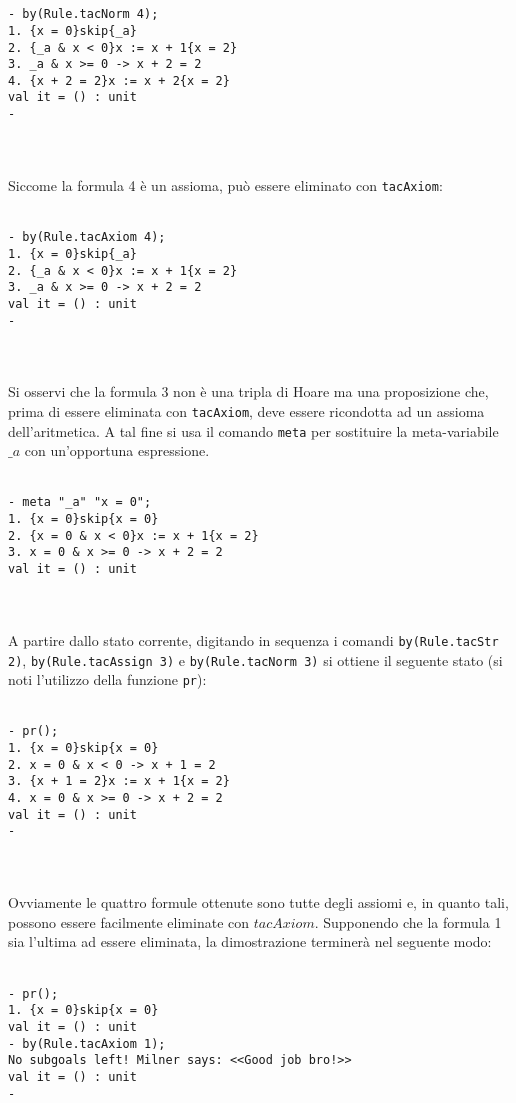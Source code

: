 \documentclass[]{article}
\begin{document}
\\
\\
\begin{BVerbatim}
- by(Rule.tacNorm 4);
1. {x = 0}skip{_a}
2. {_a & x < 0}x := x + 1{x = 2}
3. _a & x >= 0 -> x + 2 = 2
4. {x + 2 = 2}x := x + 2{x = 2}
val it = () : unit
-
\end{BVerbatim}
\\
\\
Siccome la formula 4 \`e un assioma, pu\`o essere eliminato con \texttt{tacAxiom}:
\\
\\
\begin{BVerbatim}
- by(Rule.tacAxiom 4);
1. {x = 0}skip{_a}
2. {_a & x < 0}x := x + 1{x = 2}
3. _a & x >= 0 -> x + 2 = 2
val it = () : unit
-
\end{BVerbatim}
\\
\\
Si osservi che la formula 3 non \`e una tripla di Hoare ma una proposizione che, prima di essere eliminata con \texttt{tacAxiom}, deve essere ricondotta ad un assioma dell'aritmetica. A tal fine si usa il comando \texttt{meta} per sostituire la meta-variabile $\_a$ con un'opportuna espressione.
\\
\\
\begin{BVerbatim}
- meta "_a" "x = 0";
1. {x = 0}skip{x = 0}
2. {x = 0 & x < 0}x := x + 1{x = 2}
3. x = 0 & x >= 0 -> x + 2 = 2
val it = () : unit
\end{BVerbatim}
\\
\\
A partire dallo stato corrente, digitando in sequenza i comandi \texttt{by(Rule.tacStr 2)}, \texttt{by(Rule.tacAssign 3)} e \texttt{by(Rule.tacNorm 3)} si ottiene il seguente stato (si noti l'utilizzo della funzione \texttt{pr}):
\\
\\
\begin{BVerbatim}
- pr();
1. {x = 0}skip{x = 0}
2. x = 0 & x < 0 -> x + 1 = 2
3. {x + 1 = 2}x := x + 1{x = 2}
4. x = 0 & x >= 0 -> x + 2 = 2
val it = () : unit
- 
\end{BVerbatim}
\\
\\
Ovviamente le quattro formule ottenute sono tutte degli assiomi e, in quanto tali, possono essere facilmente eliminate con $tacAxiom$. Supponendo che la formula 1 sia l'ultima ad essere eliminata, la dimostrazione terminer\`a nel seguente modo:
\\
\\
\begin{BVerbatim}
- pr();
1. {x = 0}skip{x = 0}
val it = () : unit
- by(Rule.tacAxiom 1);
No subgoals left! Milner says: <<Good job bro!>>
val it = () : unit
- 
\end{BVerbatim}
\\
\\
\end{document}
